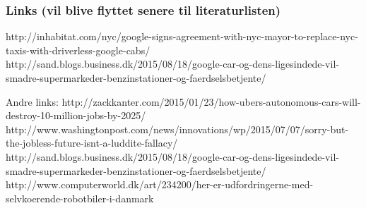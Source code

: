 \subsubsection{Links (vil blive flyttet senere til literaturlisten)}
http://inhabitat.com/nyc/google-signs-agreement-with-nyc-mayor-to-replace-nyc-taxis-with-driverless-google-cabs/ 
http://sand.blogs.business.dk/2015/08/18/google-car-og-dens-ligesindede-vil-smadre-supermarkeder-benzinstationer-og-faerdselsbetjente/


Andre links:
http://zackkanter.com/2015/01/23/how-ubers-autonomous-cars-will-destroy-10-million-jobs-by-2025/
http://www.washingtonpost.com/news/innovations/wp/2015/07/07/sorry-but-the-jobless-future-isnt-a-luddite-fallacy/
http://sand.blogs.business.dk/2015/08/18/google-car-og-dens-ligesindede-vil-smadre-supermarkeder-benzinstationer-og-faerdselsbetjente/
http://www.computerworld.dk/art/234200/her-er-udfordringerne-med-selvkoerende-robotbiler-i-danmark
